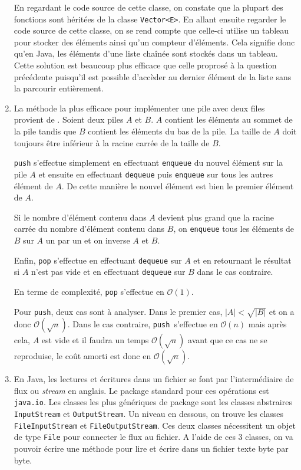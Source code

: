 \begin{enumerate}
	En regardant le code source de cette classe, on
	constate que la plupart des fonctions sont héritées
	de la classe \lstinline{Vector<E>}. En
	allant ensuite regarder le code source de cette classe,
	on se rend compte que celle-ci utilise un tableau pour
	stocker des éléments ainsi qu'un compteur d'éléments. 
	Cela signifie donc qu'en Java, les éléments d'une liste
	chaînée sont stockés dans un tableau. Cette solution
	est beaucoup plus efficace que celle proprosé à la
	question précédente puisqu'il est possible d'accèder au
	dernier élément de la liste sans la parcourir entièrement.
	\item La méthode la plus efficace pour implémenter
	une pile avec deux files provient de \cite{stack1}.
	Soient deux piles $A$ et $B$. $A$ contient les
	éléments au sommet de la pile tandis que $B$
	contient les éléments du bas de la pile. La taille
	de $A$ doit toujours être inférieur à la
	racine carrée de la taille de $B$.
	
	\lstinline{push} s'effectue simplement
	en effectuant \lstinline{enqueue} 
	du nouvel élément sur la pile $A$ et ensuite en
	effectuant \lstinline{dequeue} puis
	\lstinline{enqueue} sur tous les autres
	élément de $A$. De cette manière le nouvel élément
	est bien le premier élément de $A$.
	
	Si le nombre d'élément contenu dans $A$ devient
	plus grand que la racine carrée du nombre
	d'élément contenu dans $B$, on
	\lstinline{enqueue} tous les éléments
	de $B$ sur $A$ un par un et on inverse $A$ et $B$.
	
	Enfin, \lstinline{pop} s'effectue en
	effectuant \lstinline{dequeue} sur $A$
	et en retournant le résultat si $A$ n'est pas vide
	et en effectuant \lstinline{dequeue}
	sur $B$ dans le cas contraire.
	
	En terme de complexité,
	\lstinline{pop} s'effectue en
	$\mathcal{O}(1)$.
	
	Pour \lstinline{push}, deux cas sont
	à analyser. Dans le premier cas,
	$|A| < \sqrt{|B|}$ et on a donc
	$\mathcal{O}(\sqrt{n})$. Dans le cas contraire,
	\lstinline{push}\ s'effectue en
	$\mathcal{O}(n)$ mais après cela, $A$ est vide et
	il faudra un temps $\mathcal{O}(\sqrt{n})$ avant
	que ce cas ne se reproduise, le coût amorti est
	donc en $\mathcal{O}(\sqrt{n})$.
	\item En Java, les lectures et écritures dans un fichier
        se font par l'intermédiaire de flux ou \textit{stream}
        en anglais. Le package standard pour ces opérations
        est \lstinline{java.io}. Les classes les plus génériques
        de package sont les classes abstraires \lstinline{InputStream}
        et \lstinline{OutputStream}. Un niveau en dessous, on
        trouve les classes \lstinline{FileInputStream} et
        \lstinline{FileOutputStream}. Ces deux classes nécessitent
        un objet de type \lstinline{File} pour connecter le flux
        au fichier. A l'aide de ces 3 classes, on va pouvoir écrire
        une méthode pour lire et écrire dans un fichier texte byte
        par byte.\cite{nino}


\end{enumerate}
